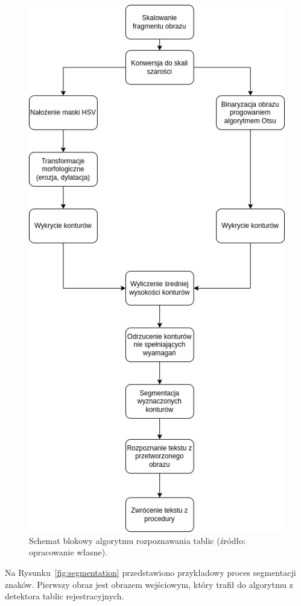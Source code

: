 \begin{figure}[!ht]
    \centering
    \includegraphics[scale=0.4]{Pictures/characters_alg}
    \caption{Schemat blokowy algorytmu rozpoznawania tablic (źródło: opracowanie własne).}
    \label{fig:characters_alg}
\end{figure}
\FloatBarrier
Na Rysunku~\ref{fig:segmentation} przedstawiono przykładowy proces segmentacji znaków.
Pierwszy obraz jest obrazem wejściowym, który trafił do algorytmu z detektora tablic rejestracyjnych.
